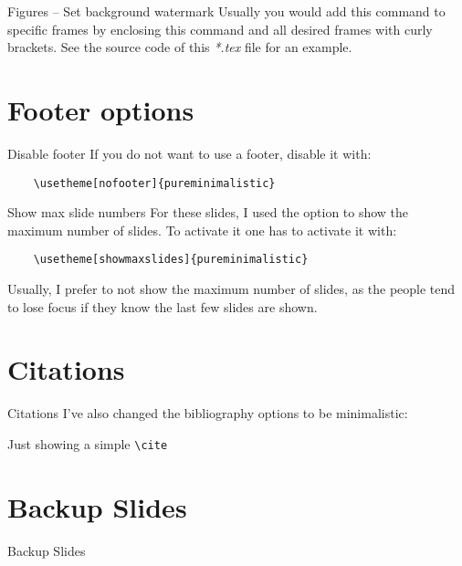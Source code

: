 \documentclass[aspectratio=169]{beamer}
\begin{document}
{
\begin{frame}{Figures -- Set background watermark}
  Usually you would add this command to specific
  frames by enclosing this command and all desired frames with
  curly brackets.
  \vfill
  See the source code of this \emph{*.tex} file for an
  example.
\end{frame}
}


\section{Footer options}
\begin{frame}[fragile]{Disable footer}
  If you do not want to use a footer, disable it with:
  \begin{verbatim}
    \usetheme[nofooter]{pureminimalistic}
  \end{verbatim}
\end{frame}

\begin{frame}[fragile]{Show max slide numbers}
  For these slides, I used the option to
  show the maximum number of slides. To activate it
  one has to activate it with:
  \begin{verbatim}
    \usetheme[showmaxslides]{pureminimalistic}
  \end{verbatim}
  Usually, I prefer to not show the maximum number of
  slides, as the people tend to lose focus if they know
  the last few slides are shown.
\end{frame}

\section{Citations}
\begin{frame}{Citations}
  I've also changed the bibliography options to be minimalistic:

  Just showing a simple \texttt{\textbackslash{}cite} \cite{AlexNet}
  \vfill
  \printbibliography
\end{frame}

\appendix %
\section*{Backup Slides}
\begin{frame}
  \centering
  \vfill
  {\fontsize{40}{50}\selectfont Backup Slides}
  \vfill
\end{frame}
\end{document}
